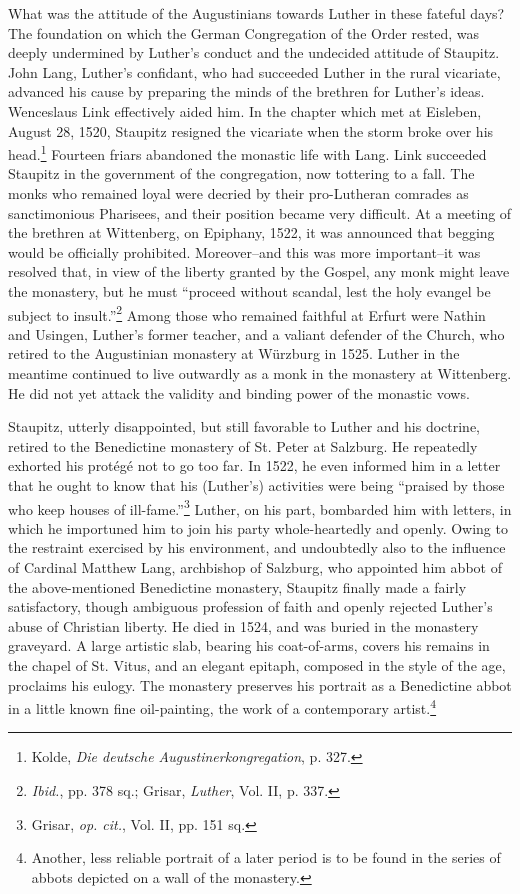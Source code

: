 What was the attitude of the Augustinians towards Luther in these
fateful days? The foundation on which the German Congregation of the Order
rested, was deeply undermined by Luther’s conduct and the undecided attitude
of Staupitz. John Lang, Luther’s
confidant, who had succeeded Luther in the rural vicariate, advanced
his cause by preparing the minds of the brethren for Luther’s ideas.
Wenceslaus Link effectively aided him. In the chapter which met at
Eisleben, August 28, 1520, Staupitz resigned the vicariate when the
storm broke over his head.\footnote{Kolde, \textit{Die deutsche Augustinerkongregation}, p. 327.}
Fourteen friars abandoned the monastic
life with Lang. Link succeeded Staupitz in the government of the
congregation, now tottering to a fall. The monks who remained loyal
were decried by their pro-Lutheran comrades as sanctimonious Pharisees,
and their position became very difficult. At a meeting of the
brethren at Wittenberg, on Epiphany, 1522, it was announced that
begging would be officially prohibited. Moreover--and this was more
important--it was resolved that, in view of the liberty granted by
the Gospel, any monk might leave the monastery, but he must “proceed
without scandal, lest the holy evangel be subject to insult.”\footnote{\textit{Ibid.}, pp. 378 sq.; Grisar, \textit{Luther}, Vol. II, p. 337.}
Among those who remained faithful at Erfurt were Nathin and
Usingen, Luther’s former teacher, and a valiant defender of the
Church, who retired to the Augustinian monastery at Würzburg in
1525. Luther in the meantime continued to live outwardly as a monk
in the monastery at Wittenberg. He did not yet attack the validity
and binding power of the monastic vows.

Staupitz, utterly disappointed, but still favorable to Luther and
his doctrine, retired to the Benedictine monastery of St. Peter at
Salzburg. He repeatedly exhorted his protégé not to go too far. In
1522, he even informed him in a letter that he ought to know that
his (Luther’s) activities were being “praised by those who keep
houses of ill-fame.”\footnote{Grisar, \textit{op. cit.}, Vol. II, pp. 151 sq.}
Luther, on his part, bombarded him with letters, in which he importuned
him to join his party whole-heartedly
and openly. Owing to the restraint exercised by his environment, and
undoubtedly also to the influence of Cardinal Matthew Lang, archbishop
of Salzburg, who appointed him abbot of the above-mentioned
Benedictine monastery, Staupitz finally made a fairly satisfactory,
though ambiguous profession of faith and openly rejected Luther’s
abuse of Christian liberty. He died in 1524, and was buried in the
monastery graveyard. A large artistic slab, bearing his coat-of-arms,
covers his remains in the chapel of St. Vitus, and an elegant epitaph,
composed in the style of the age, proclaims his eulogy. The monastery preserves
his portrait as a Benedictine abbot in a little known
fine oil-painting, the work of a contemporary artist.\footnote
{Another, less reliable portrait of a later period is to be found in the series of abbots
depicted on a wall of the monastery.}


